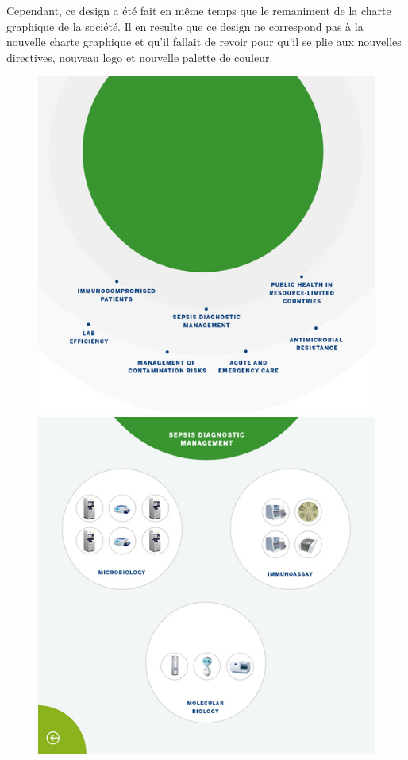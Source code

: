 \documentclass{article}
\begin{document}
Cependant, ce design a été fait en même temps que le remaniment de la charte graphique de la société.
Il en resulte que ce design ne correspond pas à la nouvelle charte graphique et qu'il fallait de revoir pour qu'il se plie aux nouvelles directives, nouveau logo et nouvelle palette de couleur.

\begin{figure}[h]
    \centering
    \includegraphics[scale=0.195]{resized-bmx-1-new.jpg}
    \includegraphics[scale=0.195]{resized-bmx-2-new.jpg}

\end{figure}
\end{document}
